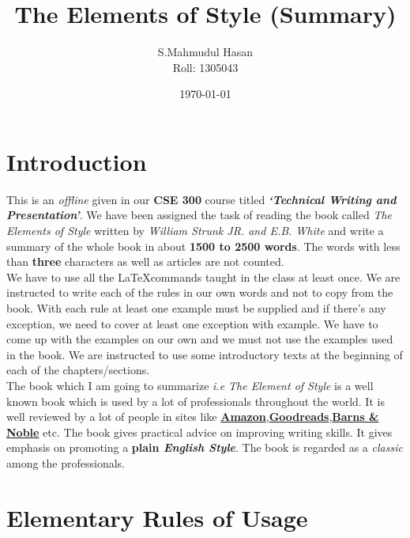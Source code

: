 \documentclass[12pt]{report}
\begin{document}
\title{\textbf{The Elements of Style (Summary)}}
\author{S.Mahmudul Hasan\\Roll: 1305043}
\date{\today}%
\maketitle
\tableofcontents


\chapter{Introduction}\label{INTRO}

\raggedright  %
This is an \textit{offline} given in our \textbf{CSE 300} course titled \textit{\textbf{`Technical Writing and Presentation'}}. We have been assigned the task of reading the book called \emph{The Elements of Style} written by \emph{William Strunk JR. \emph{and} E.B. White} and write a summary of the whole book in about \textbf{1500 to 2500 words}. The words with less than \textbf{three} characters as well as articles are not counted.\\
We have to use all the \LaTeX commands taught in the class at least once. We are instructed to write each of the rules in our own words and not to copy from the book. With each rule at least one example must be supplied and if there's any exception, we need to cover at least one exception with example. We have to come up with the examples on our own and we must not use the examples used in the book. We are instructed to use some introductory texts at the beginning of each of the chapters/sections.\\
The book which I am going to summarize \textit{i.e The Element of Style} is a well known book which is used by a lot of professionals throughout the world. It is well reviewed by a lot of people in sites like \textbf{\href{https://www.amazon.com/Elements-Style-William-Strunk-Jr/dp/1557427283}{Amazon}},\textbf{\href{http://www.goodreads.com/book/show/33514.The_Elements_of_Style}{Goodreads}},\textbf{\href{http://www.barnesandnoble.com/w/the-elements-of-style-william-strunk/1116794279}{Barns \& Noble}} etc.
The book gives practical advice on improving writing skills. It gives emphasis on promoting a \textbf{plain \textit{English Style}}. The book is regarded as a \emph{classic} among the professionals.




\chapter{Elementary Rules of Usage}\label{ERU}
\end{document}

